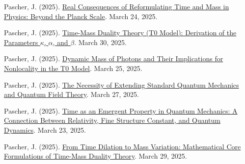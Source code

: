 \documentclass[a4paper,12pt]{article}
\begin{document}
	\begin{thebibliography}{99}
		
		 Pascher, J. (2025). \href{https://github.com/jpascher/T0-Time-Mass-Duality/tree/main/2/pdf/English/JenseitsPlanckEn.pdf}{Real Consequences of Reformulating Time and Mass in Physics: Beyond the Planck Scale}. March 24, 2025.
		
		 Pascher, J. (2025). \href{https://github.com/jpascher/T0-Time-Mass-Duality/tree/main/2/pdf/English/ZeitMasseT0ParamsEn.pdf}{Time-Mass Duality Theory (T0 Model): Derivation of the Parameters \(\kappa\), \(\alpha\), and \(\beta\)}. March 30, 2025.
		
		 Pascher, J. (2025). \href{https://github.com/jpascher/T0-Time-Mass-Duality/tree/main/2/pdf/English/DynMassePhotonenNichtlokalEn.pdf}{Dynamic Mass of Photons and Their Implications for Nonlocality in the T0 Model}. March 25, 2025.
		
		 Pascher, J. (2025). \href{https://github.com/jpascher/T0-Time-Mass-Duality/tree/main/2/pdf/English/NotwendigkeitQMErweiterungEn.pdf}{The Necessity of Extending Standard Quantum Mechanics and Quantum Field Theory}. March 27, 2025.
		
		 Pascher, J. (2025). \href{https://github.com/jpascher/T0-Time-Mass-Duality/tree/main/2/pdf/English/ZeitEmergentQMEn.pdf}{Time as an Emergent Property in Quantum Mechanics: A Connection Between Relativity, Fine Structure Constant, and Quantum Dynamics}. March 23, 2025.
		
		 Pascher, J. (2025). \href{https://github.com/jpascher/T0-Time-Mass-Duality/tree/main/2/pdf/English/MathZeitMasseLagrange.pdf}{From Time Dilation to Mass Variation: Mathematical Core Formulations of Time-Mass Duality Theory}. March 29, 2025.

		
	\end{thebibliography}
	
\end{document}
